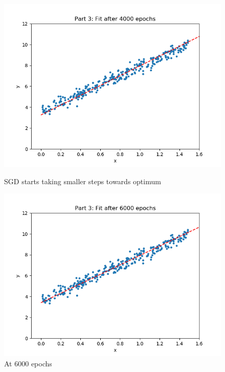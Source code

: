 \documentclass[paper=a4, fontsize=11pt]{scrartcl} %
\numberwithin{equation}{section} %
\numberwithin{figure}{section} %
\numberwithin{table}{section} %
\begin{document}
\begin{figure}[H]
    \includegraphics[width=\linewidth]{q2p33.png}
    \caption{SGD starts taking smaller steps towards optimum}
    \label{fig:q2p33}
    \includegraphics[width=\linewidth]{q2p34.png}
    \caption{At 6000 epochs}
    \label{fig:q2p34}
\end{figure}
\end{document}
